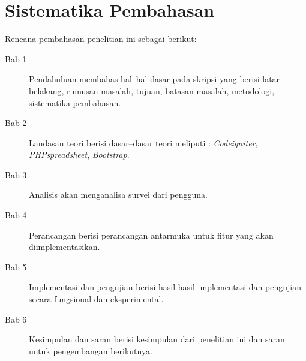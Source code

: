 \section{Sistematika Pembahasan}
\label{sec:sispem}
Rencana pembahasan penelitian ini sebagai berikut:
\begin{description}
	\item[Bab 1] Pendahuluan membahas hal--hal dasar pada skripsi yang berisi latar belakang, rumusan masalah, tujuan, batasan masalah, metodologi, sistematika pembahasan.
	\item[Bab 2] Landasan teori berisi dasar--dasar teori meliputi : \textit{Codeigniter}, \textit{PHPspreadsheet}, \textit{Bootstrap}.
	\item[Bab 3] Analisis akan menganalisa survei dari pengguna.
	\item[Bab 4] Perancangan berisi perancangan antarmuka untuk fitur yang akan diimplementasikan.  
	\item[Bab 5] Implementasi dan pengujian berisi hasil-hasil implementasi dan pengujian secara fungsional dan eksperimental.
	\item[Bab 6] Kesimpulan dan saran berisi kesimpulan dari penelitian ini dan saran untuk pengembangan berikutnya.
\end{description}
